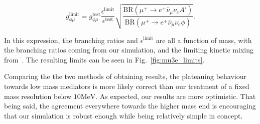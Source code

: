 \begin{equation}
    g_{\phi\mu}^\textrm{limit} = g_{\phi\mu}^\textrm{test} \frac{\epsilon^\textrm{limit}}{\epsilon^\textrm{test}}\sqrt{\frac{\textrm{BR}(\mu^+ \rightarrow e^+ \bar{\nu}_\mu \nu_e A')}{\textrm{BR}(\mu^+ \rightarrow e^+ \bar{\nu}_\mu \nu_e \phi)}}\textrm{.}
    \label{eqn:gphi_limit_echenard}
\end{equation}

In this expression, the branching ratios and $\epsilon^\textrm{limit}$ are all a function of mass, with the branching ratios coming from our simulation, and the limiting kinetic mixing from~\cite{Echenard:2014lma}.
The resulting limits can be seen in Fig.\ \ref{fig:mu3e_limits}.

\noindent Comparing the the two methods of obtaining results, the plateauing behaviour towards low mass mediators is more likely correct than our treatment of a fixed mass resolution below $10\textrm{MeV}$.
As expected, our results are more optimistic.
That being said, the agreement everywhere towards the higher mass end is encouraging that our simulation is robust enough while being relatively simple in concept.
